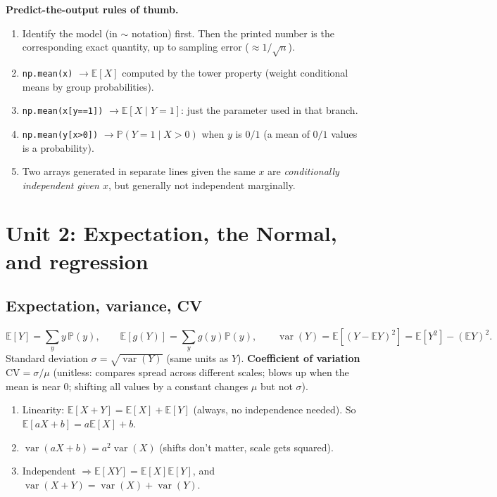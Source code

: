 \documentclass[11pt]{article}
\newcommand{\E}{\mathbb{E}}
\newcommand{\Var}{\operatorname{var}}
\renewcommand{\P}{\mathbb{P}}
\newcommand{\given}{\mid}
\newcommand{\py}[1]{\texttt{#1}}
\begin{document}
\textbf{Predict-the-output rules of thumb.}
\begin{enumerate}[leftmargin=*,itemsep=2pt]
  \item Identify the model (in $\sim$ notation) first. Then the printed number is the corresponding exact quantity, up to sampling error ($\approx 1/\sqrt n$).
  \item \py{np.mean(x)} $\to\E[X]$ computed by the tower property (weight conditional means by group probabilities).
  \item \py{np.mean(x[y==1])} $\to\E[X\given Y=1]$: just the parameter used in that branch.
  \item \py{np.mean(y[x>0])} $\to\P(Y=1\given X>0)$ when $y$ is $0/1$ (a mean of $0/1$ values is a probability).
  \item Two arrays generated in separate lines given the same $x$ are \emph{conditionally independent given $x$}, but generally not independent marginally.
\end{enumerate}

\section{Unit 2: Expectation, the Normal, and regression}

\subsection{Expectation, variance, CV}
\[
\E[Y]=\sum_y y\,\P(y),\qquad \E[g(Y)]=\sum_y g(y)\P(y),\qquad
\Var(Y)=\E[(Y-\E Y)^2]=\E[Y^2]-(\E Y)^2 .
\]
Standard deviation $\sigma=\sqrt{\Var(Y)}$ (same units as $Y$). \textbf{Coefficient of variation} $\mathrm{CV}=\sigma/\mu$ (unitless: compares spread
across different scales; blows up when the mean is near $0$; shifting all values by a constant changes $\mu$ but not $\sigma$).

\begin{keybox}[title={Properties of expectation}]
\begin{enumerate}[leftmargin=*,itemsep=1pt]
  \item Linearity: $\E[X+Y]=\E[X]+\E[Y]$ (always, no independence needed). So $\E[aX+b]=a\E[X]+b$.
  \item $\Var(aX+b)=a^2\Var(X)$ (shifts don't matter, scale gets squared).
  \item Independent $\Rightarrow\E[XY]=\E[X]\E[Y]$, and $\Var(X+Y)=\Var(X)+\Var(Y)$.
\end{enumerate}
\end{keybox}
\end{document}
